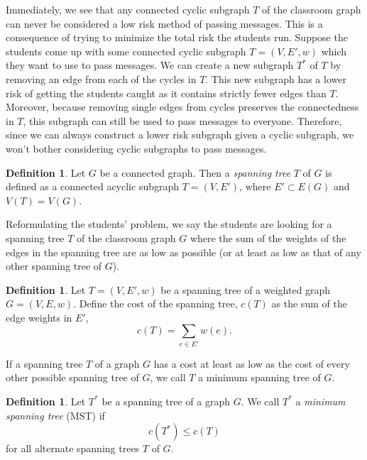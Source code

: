 \documentclass[a4paper,11pt]{report}
\theoremstyle{plain}
\theoremstyle{definition}
\newtheorem{defn}[thm]{Definition}
\begin{document}
Immediately, we see that any connected cyclic subgraph $T$ of the classroom
graph can never be considered a low risk method of passing messages. This is a
consequence of trying to minimize the total risk the students run. Suppose the
students come up with some connected cyclic subgraph $T = (V, E', w)$ which
they want to use to pass messages. We can create a new subgraph $T^*$ of $T$ by
removing an edge from each of the cycles in $T$. This new subgraph has a lower
risk of getting the students caught as it contains strictly fewer edges than
$T$. Moreover, because removing single edges from cycles preserves the
connectedness in $T$, this subgraph can still be used to pass messages to
everyone. Therefore, since we can always construct a lower risk subgraph given
a cyclic subgraph, we won't bother considering cyclic subgraphs to pass
messages.

\begin{defn}
Let $G$ be a connected graph. Then a \emph{spanning tree} $T$ of $G$
is defined as a connected acyclic subgraph $T = (V, E')$, where $E' \subset
E(G)$ and $V(T) = V(G)$.
\end{defn}

Reformulating the students' problem, we say the students are looking for a
spanning tree $T$ of the classroom graph $G$ where the sum of the weights of
the edges in the spanning tree are as low as possible (or at least as low as
that of any other spanning tree of $G$).

\begin{defn}
Let $T = (V, E', w)$ be a spanning tree of a weighted graph $G = (V, E, w)$.
Define the cost of the spanning tree, $c(T)$ as the sum of the edge weights in
$E'$,
\begin{equation*}
    c(T) = \sum_{e \in E'}{w(e)}.
\end{equation*}
\end{defn}

If a spanning tree $T$ of a graph $G$ has a cost at least as low as the
cost of every other possible spanning tree of $G$, we call $T$ a minimum
spanning tree of $G$.

\begin{defn} Let $T^*$ be a spanning tree of a graph $G$. We call $T^*$ a
\emph{minimum spanning tree} (MST) if
\begin{equation*}
    c(T^*) \leq c(T)
\end{equation*}
for all alternate spanning trees $T$ of $G$.
\end{defn}
\end{document}
